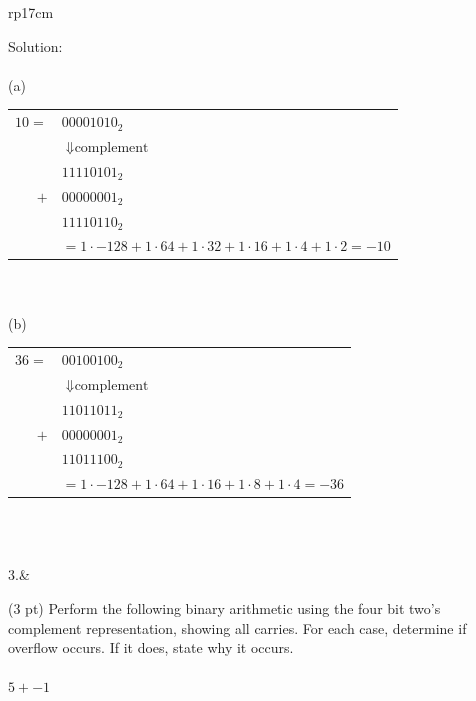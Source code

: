 \documentclass{article}
\begin{document}
\begin{longtable}[l]{rp{17cm}}
\begin{minipage}[t]{\linewidth}
Solution: \\
\\
(a)\\
\begin{tabular}{rl}
  $10 =$ & $00001010_2$\\
         & $\Downarrow \textrm{complement}$\\
         & $11110101_2$\\
     $+$ & $00000001_2$\\
         & $11110110_2$\\
         & $= 1 \cdot -128 + 1 \cdot 64 + 1 \cdot 32 + 1 \cdot 16 + 1 \cdot 4 + 1 \cdot 2= -10$
\end{tabular}\\
\\
(b)\\
\begin{tabular}{rl}
  $36 =$ & $00100100_2$\\
         & $\Downarrow \textrm{complement}$\\
         & $11011011_2$\\
     $+$ & $00000001_2$\\
         & $11011100_2$\\
         & $= 1 \cdot -128 + 1 \cdot 64 + 1 \cdot 16 + 1 \cdot 8 + 1 \cdot 4 = -36$
\end{tabular}\\
\end{minipage}\\
\medskip
3.&\begin{minipage}[t]{\linewidth}(3 pt) Perform the following binary arithmetic using the four bit two's complement representation, showing all carries.  For each case, determine if overflow occurs. If it does, state why it occurs.
\\
\\
$5 + -1$\\


\end{minipage}
\end{longtable}
\end{document}
